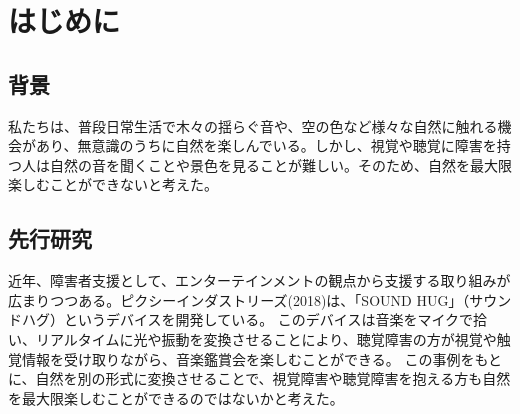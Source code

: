 \tableofcontents
\newpage

\pagestyle{fancy}
\fancyhf{}
\renewcommand{\headrulewidth}{0pt}
\makeatletter
\let\ps@plain\ps@fancy
\makeatother
\setlength{\headsep}{20pt}

\chapter{はじめに}
\section{背景}
\noindent\space
私たちは、普段日常生活で木々の揺らぐ音や、空の色など様々な自然に触れる機会があり、無意識のうちに自然を楽しんでいる。しかし、視覚や聴覚に障害を持つ人は自然の音を聞くことや景色を見ることが難しい。そのため、自然を最大限楽しむことができないと考えた。
\section{先行研究}
近年、障害者支援として、エンターテインメントの観点から支援する取り組みが広まりつつある。ピクシーインダストリーズ(2018)\cite{SOUNDHUG}は、「SOUND HUG」（サウンドハグ）というデバイスを開発している。
このデバイスは⾳楽をマイクで拾い、リアルタイムに光や振動を変換させることにより、聴覚障害の方が視覚や触覚情報を受け取りながら、音楽鑑賞会を楽しむことができる。
この事例をもとに、自然を別の形式に変換させることで、視覚障害や聴覚障害を抱える方も自然を最大限楽しむことができるのではないかと考えた。

